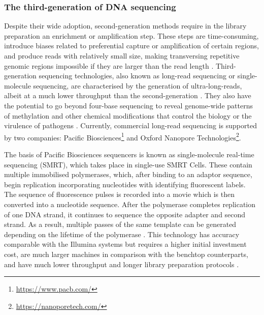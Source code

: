\subsubsection{The third-generation of DNA sequencing} \label{ssec:_intro_3rd_gen_seq}

Despite their wide adoption, second-generation methods require in the library preparation an enrichment or amplification step. 
These steps are time-consuming, introduce biases related to preferential capture or amplification of certain regions, and produce reads with relatively small size, making transversing repetitive genomic regions impossible if they are larger than the read length \citep{hagemann_overview_2015}. 
Third-generation sequencing technologies, also known as long-read sequencing or single-molecule sequencing, are characterised by the generation of ultra-long-reads, albeit at a much lower throughput than the second-generation \citep{hoang_long-reads-based_2022}. 
They also have the potential to go beyond four-base sequencing to reveal genome-wide patterns of methylation and other chemical modifications that control the biology or the virulence of pathogens \citep{korlach_going_2012}. 
Currently, commercial long-read sequencing is supported by two companies: Pacific Biosciences\footnote{\url{https://www.pacb.com/}} and Oxford Nanopore Technologies\footnote{\url{https://nanoporetech.com/}}. 

The basis of Pacific Biosciences sequencers is known as single-molecule real-time sequencing (SMRT), which takes place in single-use SMRT Cells. 
These contain multiple immobilised polymerases, which, after binding to an adaptor sequence, begin replication incorporating nucleotides with identifying fluorescent labels. 
The sequence of fluorescence pulses is recorded into a movie which is then converted into a nucleotide sequence. 
After the polymerase completes replication of one DNA strand, it continues to sequence the opposite adapter and second strand. 
As a result, multiple passes of the same template can be generated depending on the lifetime of the polymerase \citep{hoang_long-reads-based_2022, loman_twenty_2015}. 
This technology has accuracy comparable with the Illumina systems but requires a higher initial investment cost, are much larger machines in comparison with the benchtop counterparts, and have much lower throughput and longer library preparation protocols \citep{hoang_long-reads-based_2022, wenger_accurate_2019}. 

